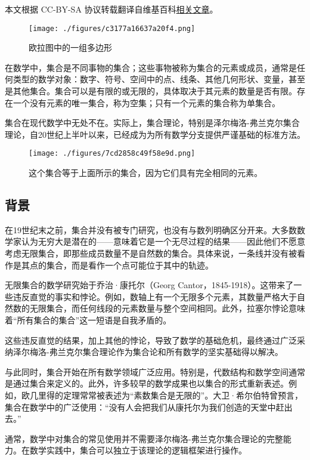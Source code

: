 
本文根据 CC-BY-SA 协议转载翻译自维基百科\href{https://en.wikipedia.org/wiki/Set_(mathematics)}{相关文章}。

\begin{figure}[ht]
\centering
\texttt{[image: ./figures/c3177a16637a20f4.png]}
\caption{欧拉图中的一组多边形} \label{fig_JHSX_1}
\end{figure}
在数学中，集合是不同事物的集合；这些事物被称为集合的元素或成员，通常是任何类型的数学对象：数字、符号、空间中的点、线条、其他几何形状、变量，甚至是其他集合。集合可以是有限的或无限的，具体取决于其元素的数量是否有限。存在一个没有元素的唯一集合，称为空集；只有一个元素的集合称为单集合。

集合在现代数学中无处不在。实际上，集合理论，特别是泽尔梅洛-弗兰克尔集合理论，自20世纪上半叶以来，已经成为为所有数学分支提供严谨基础的标准方法。
\begin{figure}[ht]
\centering
\texttt{[image: ./figures/7cd2858c49f58e9d.png]}
\caption{这个集合等于上面所示的集合，因为它们具有完全相同的元素。} \label{fig_JHSX_2}
\end{figure}
\subsection{背景}
在19世纪末之前，集合并没有被专门研究，也没有与数列明确区分开来。大多数数学家认为无穷大是潜在的——意味着它是一个无尽过程的结果——因此他们不愿意考虑无限集合，即那些成员数量不是自然数的集合。具体来说，一条线并没有被看作是其点的集合，而是看作一个点可能位于其中的轨迹。

无限集合的数学研究始于乔治·康托尔（Georg Cantor，1845-1918）。这带来了一些违反直觉的事实和悖论。例如，数轴上有一个无限多个元素，其数量严格大于自然数的无限集合，而任何线段的元素数量与整个空间相同。此外，拉塞尔悖论意味着“所有集合的集合”这一短语是自我矛盾的。

这些违反直觉的结果，加上其他的悖论，导致了数学的基础危机，最终通过广泛采纳泽尔梅洛-弗兰克尔集合理论作为集合论和所有数学的坚实基础得以解决。

与此同时，集合开始在所有数学领域广泛应用。特别是，代数结构和数学空间通常是通过集合来定义的。此外，许多较早的数学成果也以集合的形式重新表述。例如，欧几里得的定理常常被表述为“素数集合是无限的”。大卫·希尔伯特曾预言，集合在数学中的广泛使用：“没有人会把我们从康托尔为我们创造的天堂中赶出去。”

通常，数学中对集合的常见使用并不需要泽尔梅洛-弗兰克尔集合理论的完整能力。在数学实践中，集合可以独立于该理论的逻辑框架进行操作。

